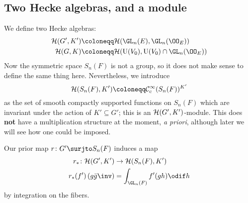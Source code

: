 \subsection{Two Hecke algebras, and a module}
We define two Hecke algebras:
\begin{align*}
  \HH(G', K') &\coloneqq \HH(\GL_n(E), \GL_n(\OO_E)) \\
  \HH(G, K) &\coloneqq \HH(\U(V_0), \U(V_0) \cap \GL_n(\OO_E))
\end{align*}
Now the symmetric space $S_n(F)$ is not a group,
so it does not make sense to define the same thing here.
Nevertheless, we introduce
\[ \HH(S_n(F), K') \coloneqq \mathcal C_{\mathrm{c}}^{\infty}(S_n(F))^{K'} \]
as the set of smooth compactly supported functions on $S_n(F)$
which are invariant under the action of $K' \subseteq G'$;
this is an $\mathcal H(G', K')$-module.
This does \textbf{not} have a multiplication structure at the moment, \emph{a priori},
although later we will see how one could be imposed.

Our prior map $r \colon G' \surjto S_n(F)$ induces a map
\begin{align*}
  r_\ast \colon \HH(G', K') &\to \HH(S_n(F), K') \\
  r_\ast(f')\left( g\bar{g}\inv \right) &= \int_{\GL_n(F)} f'(gh) \odif h
\end{align*}
by integration on the fibers.

